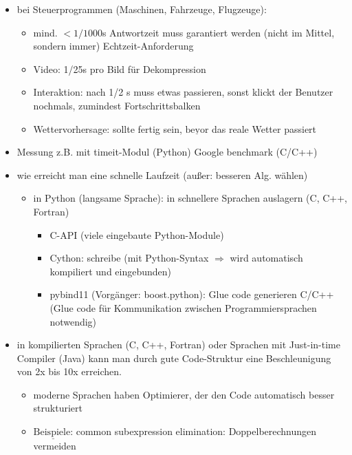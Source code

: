 \documentclass[11pt, fleqn]{scrreprt}
\begin{document}
    \begin{itemize}
        \item bei Steuerprogrammen (Maschinen, Fahrzeuge, Flugzeuge):
        \begin{itemize}
            \item mind. $< 1/1000$s Antwortzeit muss garantiert werden (nicht im Mittel, sondern immer) \glqq Echtzeit-Anforderung\grqq
            \item Video: 1/25s pro Bild für Dekompression
            \item Interaktion: nach 1/2 s muss etwas passieren, sonst klickt der Benutzer nochmals, zumindest Fortschrittsbalken
            \item Wettervorhersage: sollte fertig sein, $\underline{\text{bevor}}$ das reale Wetter passiert
        \end{itemize}
        \item Messung z.B. mit timeit-Modul (Python) Google benchmark (C/C++)
        \item wie erreicht man eine schnelle Laufzeit (außer: besseren Alg. wählen)
        \begin{itemize}
            \item in Python (langsame Sprache): in schnellere Sprachen auslagern (C, C++, Fortran)
            \begin{itemize}
                \item C-API (viele eingebaute Python-Module)
                \item Cython: schreibe (mit Python-Syntax $\Rightarrow$ wird automatisch kompiliert und eingebunden)
                \item pybind11 (Vorgänger: boost.python): Glue code generieren C/C++ (Glue code für Kommunikation zwischen Programmiersprachen notwendig)
            \end{itemize}
        \end{itemize}
        \item in kompilierten Sprachen (C, C++, Fortran) oder Sprachen mit Just-in-time Compiler (Java) kann man durch gute Code-Struktur eine Beschleunigung von 2x bis 10x erreichen.
        \begin{itemize}
            \item moderne Sprachen haben \glqq Optimierer\grqq , der den Code automatisch besser strukturiert
            \item $\underline{\text{Beispiele:}}$ \glqq common subexpression elimination\grqq : Doppelberechnungen vermeiden \\

\end{itemize}
\end{itemize}
\end{document}
